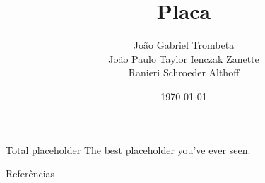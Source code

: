\documentclass{beamer}
\title{Placa}
\author{João Gabriel Trombeta\\
        João Paulo Taylor Ienczak Zanette\\
        Ranieri Schroeder Althoff}
\date{\today}
\begin{document}
\maketitle{}

\begin{frame}{Total placeholder}
    The best placeholder you've ever seen.
\end{frame}



\begin{frame}{Referências}
    \nocite{*}
    
\end{frame}
\end{document}

